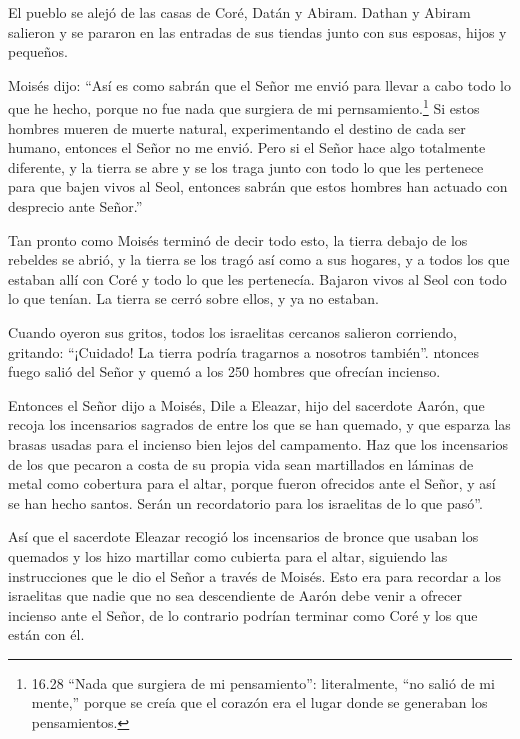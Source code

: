  El pueblo se alejó de las casas de Coré, Datán y Abiram.
Dathan y Abiram salieron y se pararon en las entradas de sus tiendas
junto con sus esposas, hijos y pequeños.

 Moisés dijo: ``Así es como sabrán que el Señor me envió
para llevar a cabo todo lo que he hecho, porque no fue nada que surgiera
de mi pernsamiento.\footnote{16.28 ``Nada que surgiera de mi
  pensamiento'': literalmente, ``no salió de mi mente,'' porque se creía
  que el corazón era el lugar donde se generaban los pensamientos.}
 Si estos hombres mueren de muerte natural, experimentando
el destino de cada ser humano, entonces el Señor no me envió.
 Pero si el Señor hace algo totalmente diferente, y la
tierra se abre y se los traga junto con todo lo que les pertenece para
que bajen vivos al Seol, entonces sabrán que estos hombres han actuado
con desprecio ante Señor.''

 Tan pronto como Moisés terminó de decir todo esto, la
tierra debajo de los rebeldes se abrió,  y la tierra se los
tragó así como a sus hogares, y a todos los que estaban allí con Coré y
todo lo que les pertenecía.  Bajaron vivos al Seol con todo
lo que tenían. La tierra se cerró sobre ellos, y ya no estaban.

 Cuando oyeron sus gritos, todos los israelitas cercanos
salieron corriendo, gritando: ``¡Cuidado! La tierra podría tragarnos a
nosotros también''.  ntonces fuego salió del Señor y quemó
a los 250 hombres que ofrecían incienso.

 Entonces el Señor dijo a Moisés,  Dile a
Eleazar, hijo del sacerdote Aarón, que recoja los incensarios sagrados
de entre los que se han quemado, y que esparza las brasas usadas para el
incienso bien lejos del campamento.  Haz que los
incensarios de los que pecaron a costa de su propia vida sean
martillados en láminas de metal como cobertura para el altar, porque
fueron ofrecidos ante el Señor, y así se han hecho santos. Serán un
recordatorio para los israelitas de lo que pasó''.

 Así que el sacerdote Eleazar recogió los incensarios de
bronce que usaban los quemados y los hizo martillar como cubierta para
el altar,  siguiendo las instrucciones que le dio el Señor
a través de Moisés. Esto era para recordar a los israelitas que nadie
que no sea descendiente de Aarón debe venir a ofrecer incienso ante el
Señor, de lo contrario podrían terminar como Coré y los que están con
él.

